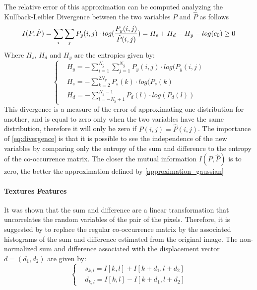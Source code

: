 The relative error of this approximation can be computed analyzing the Kullback-Leibler Divergence between the two variables $P$ and $\hat{P}$ as follows
\begin{equation}
\label{eq:divergence}
    I(P, \hat{P}) = \sum_i\sum_j P_y(i,j)\cdot log(\frac{P_y(i,j)}{\hat{P}(i,j)}) = \\
    H_s + H_d - H_y -log(c_0)\geq0
\end{equation}{}
Where $H_s$, $H_d$ and $H_y$ are the entropies given by:
\begin{equation}
\begin{cases}
&H_y = -\sum_{i=1}^{N_g}\sum_{j=1}^{N_g}P_y(i,j)\cdot log(P_y(i,j)\\
&H_s = -\sum_{k=2}^{2N_g}P_s(k)\cdot log(P_s(k)\\
&H_d = -\sum_{l=-N_g+1}^{N_g-1}P_d(l)\cdot log(P_d(l))
\end{cases}
\end{equation}
This divergence is a measure of the error of approximating one distribution for another, and is equal to zero only when the two variables have the same distribution, therefore it will only be zero if $P(i,j)=\hat{P}(i,j)$. The importance of \ref{eq:divergence} is that it is possible to see the independence of the new variables by comparing only the entropy of the sum and difference to the entropy of the co-occurrence matrix. The closer the mutual information $I(P, \hat{P})$ is to zero, the better the approximation defined by \ref{approximation_gaussian}

\paragraph{Textures Features}
It was shown that the sum and difference are a linear transformation that uncorrelates the random variables of the pair of the pixels. Therefore, it is suggested by \cite{Unser} to replace the regular co-occurrence matrix by the associated histograms of the sum and difference estimated from the original image.
The non-normalized sum and difference associated with the displacement vector $d=(d_1,d_2)$ are given by:
\begin{equation}
\begin{cases}
&s_{k,l} = I[k,l] + I[k+d_1, l+d_2]\\
&d_{k,l} = I[k,l] - I[k+d_1, l+d_2]
\end{cases}
\end{equation}

